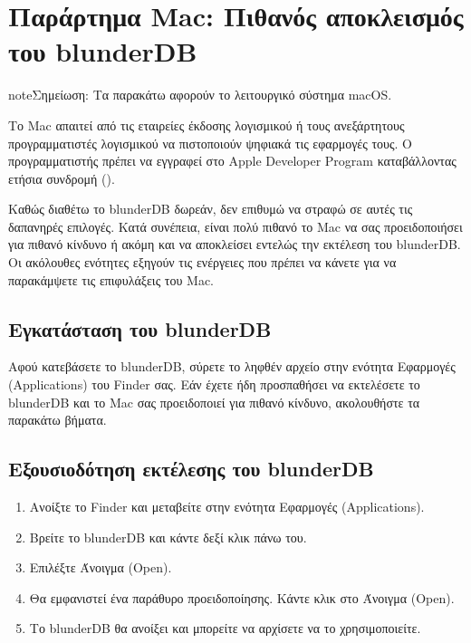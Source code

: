 \documentclass[letterpaper,10pt,greek]{sphinxmanual}
\begin{document}
\sphinxstepscope


\section{Παράρτημα Mac: Πιθανός αποκλεισμός του blunderDB}
\label{\detokenize{annexe_mac_securite:annexe-mac-blocage-eventuel-de-blunderdb}}\label{\detokenize{annexe_mac_securite:annexe-mac-malware}}\label{\detokenize{annexe_mac_securite::doc}}
\begin{sphinxadmonition}{note}{Σημείωση:}
\sphinxAtStartPar
Τα παρακάτω αφορούν το λειτουργικό σύστημα macOS.
\end{sphinxadmonition}

\sphinxAtStartPar
Το Mac απαιτεί από τις εταιρείες έκδοσης λογισμικού ή τους ανεξάρτητους προγραμματιστές λογισμικού να πιστοποιούν ψηφιακά τις εφαρμογές τους. Ο προγραμματιστής πρέπει να εγγραφεί στο Apple Developer Program καταβάλλοντας ετήσια συνδρομή ().

\sphinxAtStartPar
Καθώς διαθέτω το blunderDB δωρεάν, δεν επιθυμώ να στραφώ σε αυτές τις δαπανηρές επιλογές. Κατά συνέπεια, είναι πολύ πιθανό το Mac να σας προειδοποιήσει για πιθανό κίνδυνο ή ακόμη και να αποκλείσει εντελώς την εκτέλεση του blunderDB. Οι ακόλουθες ενότητες εξηγούν τις ενέργειες που πρέπει να κάνετε για να παρακάμψετε τις επιφυλάξεις του Mac.


\subsection{Εγκατάσταση του blunderDB}
\label{\detokenize{annexe_mac_securite:installation-de-blunderdb}}
\sphinxAtStartPar
Αφού κατεβάσετε το blunderDB, σύρετε το ληφθέν αρχείο στην ενότητα Εφαρμογές (Applications) του Finder σας. Εάν έχετε ήδη προσπαθήσει να εκτελέσετε το blunderDB και το Mac σας προειδοποιεί για πιθανό κίνδυνο, ακολουθήστε τα παρακάτω βήματα.


\subsection{Εξουσιοδότηση εκτέλεσης του blunderDB}
\label{\detokenize{annexe_mac_securite:autorisation-de-l-execution-de-blunderdb}}\begin{enumerate}
%
\item {} 
\sphinxAtStartPar
Ανοίξτε το Finder και μεταβείτε στην ενότητα Εφαρμογές (Applications).

\item {} 
\sphinxAtStartPar
Βρείτε το blunderDB και κάντε δεξί κλικ πάνω του.

\item {} 
\sphinxAtStartPar
Επιλέξτε Άνοιγμα (Open).

\item {} 
\sphinxAtStartPar
Θα εμφανιστεί ένα παράθυρο προειδοποίησης. Κάντε κλικ στο Άνοιγμα (Open).

\item {} 
\sphinxAtStartPar
Το blunderDB θα ανοίξει και μπορείτε να αρχίσετε να το χρησιμοποιείτε.

\end{enumerate}
\end{document}
